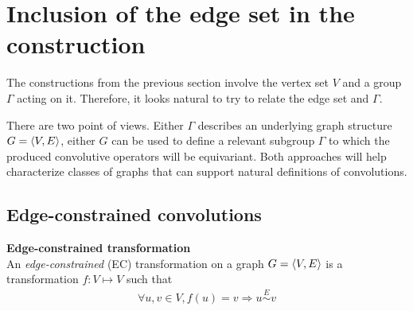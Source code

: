 \section{Inclusion of the edge set in the construction}
\label{sec:edges}


The constructions from the previous section involve the vertex set $V$ and a group $\Gamma$ acting on it. Therefore, it looks natural to try to relate the edge set and $\Gamma$.

There are two point of views. Either $\Gamma$ describes an underlying graph structure $G = \langle V, E \rangle$, either $G$ can be used to define a relevant subgroup $\Gamma$ to which the produced convolutive operators will be equivariant. Both approaches will help characterize classes of graphs that can support natural definitions of convolutions.




\subsection{Edge-constrained convolutions}
\label{sec:cayley}


\begin{definition}\textbf{Edge-constrained transformation}\\
An \emph{edge-constrained} (EC) transformation on a graph $G = \langle V, E \rangle$ is a transformation $f: V \mapsto V$ such that
\begin{gather*}
\forall u,v \in V, f(u) = v \Rightarrow u \overset{E}{\sim} v
\end{gather*}
\end{definition}

